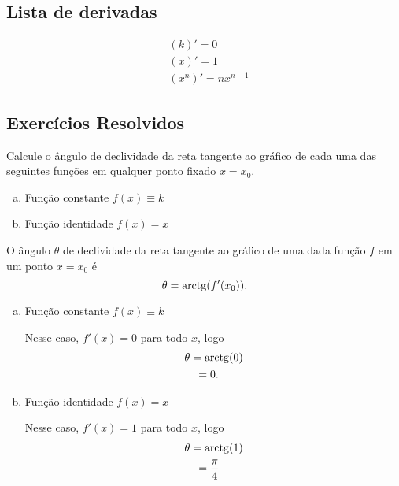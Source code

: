 \subsection{Lista de derivadas}

\begin{align}
  & (k)' = 0\\
  & (x)' = 1\\
  & (x^n)' = nx^{n-1}
\end{align}


\subsection{Exercícios Resolvidos}

\begin{exeresol}
  Calcule o ângulo de declividade da reta tangente ao gráfico de cada uma das seguintes funções em qualquer ponto fixado $x = x_0$.
  \begin{enumerate}[a)]
  \item Função constante $f(x) \equiv k$
  \item Função identidade $f(x) = x$
  \end{enumerate}
\end{exeresol}
\begin{resol}
  O ângulo $\theta$ de declividade da reta tangente ao gráfico de uma dada função $f$ em um ponto $x=x_0$ é
  \begin{equation}
    \theta = \operatorname{arctg}(f'(x_0)).
  \end{equation}
  \begin{enumerate}[a)]
  \item Função constante $f(x) \equiv k$

    Nesse caso, $f'(x) = 0$ para todo $x$, logo
    \begin{align}
      & \theta = \operatorname{arctg}(0) \\
      & \text{}\quad = 0.
    \end{align}
  \item Função identidade $f(x) = x$

    Nesse caso, $f'(x) = 1$ para todo $x$, logo
    \begin{align}
      & \theta = \operatorname{arctg}(1)\\
      & \text{}\quad = \frac{\pi}{4}
    \end{align}
  \end{enumerate}
\end{resol}

